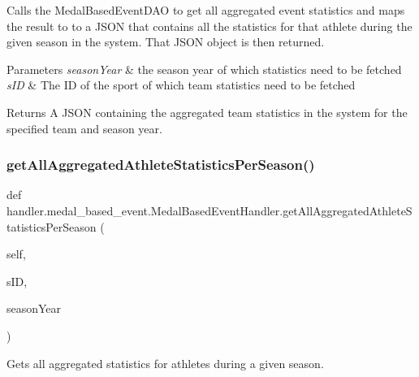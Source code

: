 Calls the Medal\+Based\+Event\+D\+AO to get all aggregated event statistics and maps the result to to a J\+S\+ON that contains all the statistics for that athlete during the given season in the system. That J\+S\+ON object is then returned.


\begin{DoxyParams}{Parameters}
{\em season\+Year} & the season year of which statistics need to be fetched \\
\hline
{\em s\+ID} & The ID of the sport of which team statistics need to be fetched\\
\hline
\end{DoxyParams}
\begin{DoxyReturn}{Returns}
A J\+S\+ON containing the aggregated team statistics in the system for the specified team and season year. 
\end{DoxyReturn}
\mbox{\label{classhandler_1_1medal__based__event_1_1_medal_based_event_handler_aa8fa362bc23391c161bf5686adb9a3b3}} 
\subsubsection{\texorpdfstring{get\+All\+Aggregated\+Athlete\+Statistics\+Per\+Season()}{getAllAggregatedAthleteStatisticsPerSeason()}}
{\footnotesize\ttfamily def handler.\+medal\+\_\+based\+\_\+event.\+Medal\+Based\+Event\+Handler.\+get\+All\+Aggregated\+Athlete\+Statistics\+Per\+Season (\begin{DoxyParamCaption}\item[{}]{self,  }\item[{}]{s\+ID,  }\item[{}]{season\+Year }\end{DoxyParamCaption})}



Gets all aggregated statistics for athletes during a given season. 

